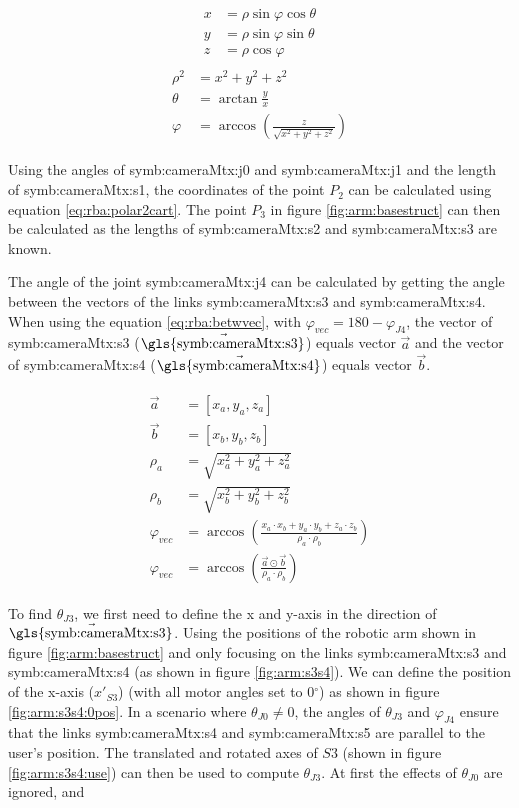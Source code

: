 \documentclass{article}
\newcommand{\sie}[1]{\text{\gls{symb:cameraMtx:#1}}}   %
\newcommand{\sba}[1]{\gls{symb:cameraMtx:#1}}          %
\newcommand{\degrs}{\ensuremath{^{\circ}}}
\begin{document}
\begin{align}
    \begin{split}
        x &=\rho \sin \varphi \cos \theta \\
        y &=\rho \sin \varphi \sin \theta \\
        z &=\rho \cos \varphi
    \end{split} \label{eq:rba:polar2cart}
\end{align}
\begin{align}
    \begin{split}
        \rho^{2} &={x}^{2}+{y}^{2}+z^{2} \\
        \theta &=\arctan\frac{{y}}{{x}} \\
        \varphi &=\arccos \left(\frac{{z}}{\sqrt{{x}^{2}+{y}^{2}+{z}^{2}}}\right)
    \end{split} \label{eq:rba:cart2polar}
\end{align}

Using the angles of \sba{j0} and \sba{j1} and the length of \sba{s1}, the coordinates of the point $P_2$ can be calculated using equation \ref{eq:rba:polar2cart}.  The point $P_3$ in figure \ref{fig:arm:basestruct} can then be calculated as the lengths of \sba{s2} and \sba{s3} are known.  

The angle of the joint \sba{j4} can be calculated by getting the angle between the vectors of the links \sba{s3} and \sba{s4}.  When using the equation \ref{eq:rba:betwvec}, with $\varphi_{vec} = 180-\varphi_{J4}$, the vector of \sba{s3} ($\Vec{\sie{s3}}$) equals vector $\vec{a}$ and the vector of \sba{s4} ($\vec{\sie{s4}}$) equals vector $\vec{b}$.

\begin{align}
    \begin{split}
        \vec{a} &= [x_a, y_a, z_a]\\
        \vec{b} &= [x_b, y_b, z_b]\\
        \rho_a &= \sqrt{x_a^2 + y_a^2 + z_a^2}\\
        \rho_b &= \sqrt{x_b^2 + y_b^2 + z_b^2}\\
        \varphi_{vec} &= \arccos(\frac{x_a\cdot x_b + y_a\cdot y_b + z_a\cdot z_b}{\rho_a\cdot \rho_b})\\
        \varphi_{vec} &= \arccos(\frac{\vec{a}\odot \vec{b}}{\rho_a\cdot \rho_b})
    \end{split} \label{eq:rba:betwvec}
\end{align}

To find $\theta_{J3}$, we first need to define the x and y-axis in the direction of $\vec{\sie{s3}}$.  Using the positions of the robotic arm shown in figure \ref{fig:arm:basestruct} and only focusing on the links \sba{s3} and \sba{s4} (as shown in figure \ref{fig:arm:s3s4}).  We can define the position of the x-axis ($x'_{S3}$) (with all motor angles set to 0\degrs) as shown in figure \ref{fig:arm:s3s4:0pos}.  In a scenario where $\theta_{J0}\neq 0$, the angles of $\theta_{J3}$ and $\varphi_{J4}$ ensure that the links \sba{s4} and \sba{s5} are parallel to the user's position.  The translated and rotated axes of $S3$ (shown in figure \ref{fig:arm:s3s4:use}) can then be used to compute $\theta_{J3}$.  At first the effects of $\theta_{J0}$ are ignored, and 
\end{document}
